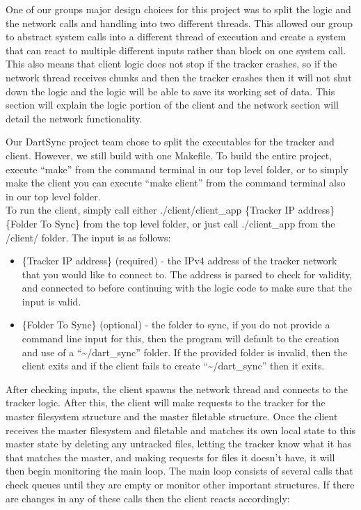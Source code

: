 	
	One of our groups major design choices for this project was to split the logic and the network calls and handling into two different threads.  This allowed our group to abstract system calls into a different thread of execution and create a system that can react to multiple different inputs rather than block on one system call.  This also means that client logic does not stop if the tracker crashes, so if the network thread receives chunks and then the tracker crashes then it will not shut down the logic and the logic will be able to save its working set of data.  This section will explain the logic portion of the client and the network section will detail the network functionality.


	Our DartSync project team chose to split the executables for the tracker and client.  However, we still build with one Makefile.  To build the entire project, execute ``make'' from the command terminal in our top level folder, or to simply make the client you can execute ``make client'' from the command terminal also in our top level folder.  \\

	To run the client, simply call either ./client/client_app \{Tracker IP address\} \{Folder To Sync\} from the top level folder, or just call ./client_app from the /client/ folder.  The input is as follows:
	
	\begin{itemize}
		\item \{Tracker IP address\} (required) - the IPv4 address of the tracker network that you would like to connect to.  The address is parsed to check for validity, and connected to before continuing with the logic code to make sure that the input is valid.
		\item \{Folder To Sync\} (optional) - the folder to sync, if you do not provide a command line input for this, then the program will default to the creation and use of a ``\textasciitilde/dart_sync'' folder.  If the provided folder is invalid, then the client exits and if the client fails to create ``\textasciitilde/dart_sync'' then it exits.
	\end{itemize}


	After checking inputs, the client spawns the network thread and connects to the tracker logic. After this, the client will make requests to the tracker for the master filesystem structure and the master filetable structure. Once the client receives the master filesystem and filetable and matches its own local state to this master state by deleting any untracked files, letting the tracker know what it has that matches the master, and making requests for files it doesn't have, it will then begin monitoring the main loop.  The main loop consists of several calls that check queues until they are empty or monitor other important structures.  If there are changes in any of these calls then the client reacts accordingly:

